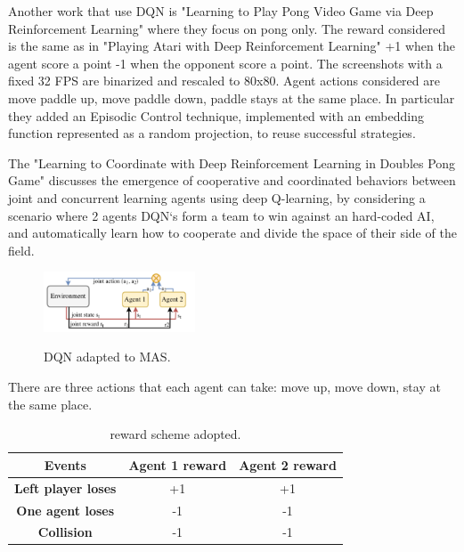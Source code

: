 Another work that use DQN is "Learning to Play Pong Video Game via Deep Reinforcement Learning" where they focus on pong only.
The reward considered is the same as in "Playing Atari with Deep Reinforcement Learning" +1 when the agent score a point -1 when the opponent score a point.
The screenshots with a fixed 32 FPS are binarized and rescaled to 80x80.
Agent actions considered are move paddle up, move paddle down, paddle stays at the same place.
In particular they added an Episodic Control technique, implemented with an embedding function represented as a random projection, to reuse successful strategies.




The "Learning to Coordinate with Deep Reinforcement Learning in Doubles Pong Game" discusses the emergence of cooperative and coordinated behaviors between joint and concurrent learning
agents using deep Q-learning, by considering a scenario where 2 agents DQN`s form a team to win against an hard-coded AI,
and automatically learn how to cooperate and divide the space of their side of the field.

\begin{figure}[ht]
  \centering
  \includegraphics[width=0.4\textwidth]{images/DQN_MAS.png}
  \label{dqnmas}
  \caption{DQN adapted to MAS.}
\end{figure}

There are three actions that each agent can take: move up, move down, stay at the same place.

\begin{table}[ht]
  \centering
  \begin{tabular}{@{}ccc@{}}
    \toprule
    \textbf{Events}            & \textbf{Agent 1 reward} & \textbf{Agent 2 reward} \\ \midrule
    \textbf{Left player loses} & +1                      & +1                      \\
    \textbf{One agent loses}   & -1                      & -1                      \\
    \textbf{Collision}         & -1                      & -1                      \\ \bottomrule
  \end{tabular}
  \label{my-table}
  \caption{reward scheme adopted.}
\end{table}


